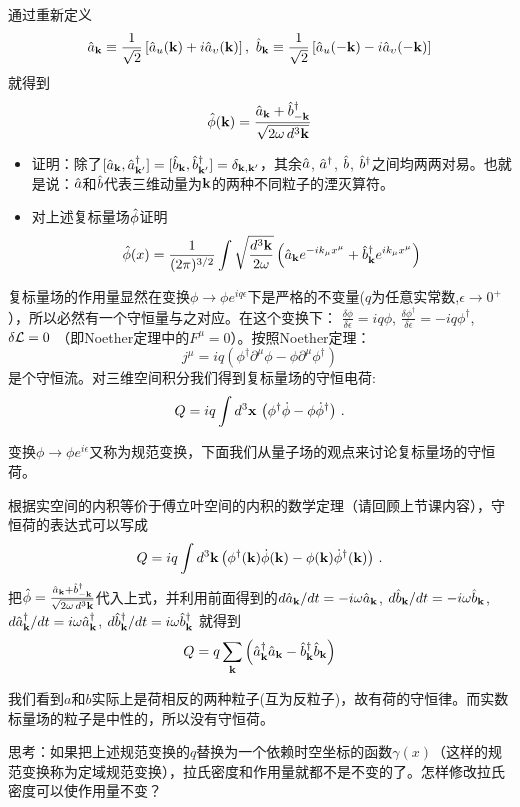 \documentclass[CJK]{beamer}
\begin{document}
\begin{frame}
\bch

通过重新定义
$$\hata_\veck \equiv \frac{1}{\sqrt{2}}\left[\hata_u(\veck) + i\hata_\vel(\veck)\right],\ \hatb_\veck \equiv\frac{1}{\sqrt{2}}\left[\hata_u(-\veck) -i \hata_\vel(-\veck)\right]$$
就得到
$${\hat{\phi}}({\mathbf{k}}) = \frac{{\hat{a}}_{{\mathbf{k}}}+{\hat{b}^\dagger}_{-{\mathbf{k}}}}{\sqrt{2\omega\, d^3{\mathbf{k}}}}$$

\ech
\end{frame}

\begin{frame}
\bch
\begin{itemize}
\item{证明：除了$[{\hat{a}}_{\mathbf{k}},{\hat{a}^\dagger}_{{\mathbf{k}}'}]=[{\hat{b}}_{\mathbf{k}},{\hat{b}^\dagger}_{{\mathbf{k}}'}]=\delta_{{\mathbf{k}},{\mathbf{k}}'}$，其余${\hat{a}}$, ${\hat{a}^\dagger}$, ${\hat{b}}$, ${\hat{b}^\dagger}$之间均两两对易。也就是说：${\hat{a}}$和${\hat{b}}$代表三维动量为${\mathbf{k}}$的两种不同粒子的湮灭算符。}
\item{对上述复标量场${\hat{\phi}}$证明$${\hat{\phi}}(x) = \frac{1}{(2\pi)^{3/2}} \int \sqrt{\frac{d^3{\mathbf{k}}}{2\omega}} \left({\hat{a}}_{{\mathbf{k}}} e^{-ik_\mu x^\mu} + {\hat{b}^\dagger}_{{\mathbf{k}}}e^{ik_\mu x^\mu}\right) $$}
\end{itemize}
\ech
\end{frame}

\begin{frame}
\bch
复标量场的作用量显然在变换$\phi \rightarrow \phi e^{iq\epsilon}$下是严格的不变量($q$为任意实常数,$\epsilon\rightarrow 0^+$），所以必然有一个守恒量与之对应。在这个变换下：
$\frac{\delta \phi}{\delta \epsilon} = iq\phi$, $\frac{\delta\phi^\dagger}{\delta\epsilon} = - i q\phi^\dagger$, $\delta {\mathcal{L}} = 0$ （即Noether定理中的$F^\mu = 0$）。按照Noether定理：
$$j^\mu = iq\left(\phi^\dagger\partial^\mu\phi-\phi\partial^\mu\phi^\dagger\right)$$
是个守恒流。对三维空间积分我们得到复标量场的守恒电荷:
$$Q = iq\int d^3{\mathbf{x}}\, \left(\phi^\dagger \dot\phi  - \phi \dot\phi^\dagger\right)\,.$$

\skipline
变换$\phi \rightarrow \phi e^{i\epsilon}$又称为规范变换，下面我们从量子场的观点来讨论复标量场的守恒荷。

\ech
\end{frame}

\begin{frame}
\bch
根据实空间的内积等价于傅立叶空间的内积的数学定理（请回顾上节课内容），守恒荷的表达式可以写成
$$Q = iq \int d^3{\mathbf{k}} \left(\phi^\dagger({\mathbf{k}}) \dot\phi ({\mathbf{k}}) - \phi ({\mathbf{k}})\dot\phi^\dagger({\mathbf{k}})\right)\, .$$
把${\hat{\phi}} = \frac{{\hat{a}}_{\mathbf{k}} + {\hat{b}^\dagger}_{-{\mathbf{k}}}}{\sqrt{2\omega\, d^3{\mathbf{k}}}}$代入上式，并利用前面得到的$d {\hat{a}}_{\mathbf{k}}/dt = -i\omega{\hat{a}}_{\mathbf{k}}$, $d {\hat{b}}_{\mathbf{k}}/dt = -i\omega{\hat{b}}_{\mathbf{k}}$, $d{\hat{a}^\dagger}_{\mathbf{k}}/dt = i\omega{\hat{a}^\dagger}_{\mathbf{k}}$, $d{\hat{b}^\dagger}_{\mathbf{k}}/dt = i\omega {\hat{b}^\dagger}_{\mathbf{k}}$  就得到
$$Q =q\sum_{{\mathbf{k}}} \left({\hat{a}^\dagger}_{\mathbf{k}}{\hat{a}}_{\mathbf{k}} - {\hat{b}^\dagger}_{{\mathbf{k}}}{\hat{b}}_{{\mathbf{k}}}\right)$$

我们看到$a$和$b$实际上是荷相反的两种粒子(互为反粒子)，故有荷的守恒律。而实数标量场的粒子是中性的，所以没有守恒荷。
\ech
\end{frame}

\begin{frame}
\bch
思考：如果把上述规范变换的$q$替换为一个依赖时空坐标的函数$\gamma(x)$（这样的规范变换称为定域规范变换），拉氏密度和作用量就都不是不变的了。怎样修改拉氏密度可以使作用量不变？
\ech
\end{frame}
\end{document}
